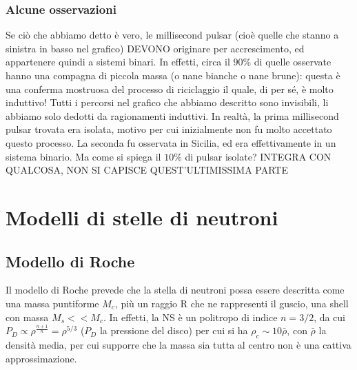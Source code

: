 \subsubsection{Alcune osservazioni}
Se ciò che abbiamo detto è vero, le millisecond pulsar (cioè quelle che stanno a sinistra in basso nel grafico) DEVONO originare per accrescimento, ed appartenere quindi a sistemi binari.
In effetti, circa il $90\%$ di quelle osservate hanno una compagna di piccola massa (o nane bianche o nane brune): questa è una conferma mostruosa del processo di riciclaggio il quale, di per sé, è molto induttivo!
Tutti i percorsi nel grafico che abbiamo descritto sono invisibili, li abbiamo solo dedotti da ragionamenti induttivi.
In realtà, la prima millisecond pulsar trovata era isolata, motivo per cui inizialmente non fu molto accettato questo processo.
La seconda fu osservata in Sicilia, ed era effettivamente in un sistema binario. Ma come si spiega il $10\%$ di pulsar isolate? INTEGRA CON QUALCOSA, NON SI CAPISCE QUEST'ULTIMISSIMA PARTE

\section{Modelli di stelle di neutroni}

\subsection{Modello di Roche}
Il modello di Roche prevede che la stella di neutroni possa essere descritta come una massa puntiforme $M_c$, più un raggio R che ne rappresenti il guscio, una shell con massa $M_s<<M_c$.
In effetti, la NS è un politropo di indice $n=3/2$,  da cui $P_D\propto \rho^{\frac{n+1}{n}} = \rho^{5/3} $ ($P_D$ la pressione del disco) per cui si ha $\rho_c \sim 10\bar{\rho}$, con $\bar{\rho}$ la densità media, per cui supporre che la massa sia tutta al centro non è una cattiva approssimazione.
